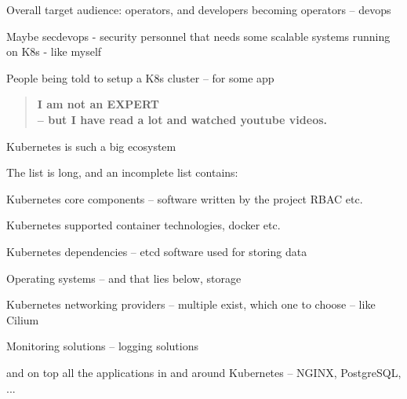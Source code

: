 \documentclass[Screen16to9,17pt]{foils}
\begin{document}


\begin{quote}

\end{quote}

\begin{list2}
\item Overall target audience: operators, and developers becoming operators -- devops
\item Maybe secdevops - security personnel that needs some scalable systems running on K8s
    - like myself
\item People being told to setup a K8s cluster -- for some app
\end{list2}



\begin{quote}
\large \bf I am not an EXPERT \\
-- but I have read a lot and watched youtube videos. \smiley
\end{quote}

\begin{list1}
\item Kubernetes is such a big ecosystem
\item The list is long, and an incomplete list contains:
\begin{list2}
\item Kubernetes core components -- software written by the project RBAC etc.
\item Kubernetes supported container technologies, docker etc.
\item Kubernetes dependencies -- etcd software used for storing data
\item Operating systems -- and that lies below, storage
\item Kubernetes networking providers -- multiple exist, which one to choose -- like Cilium
\item Monitoring solutions -- logging solutions
\end{list2}
\item and on top all the applications in and around Kubernetes -- NGINX, PostgreSQL, ...
\end{list1}

\end{document}
